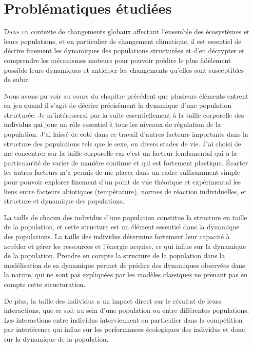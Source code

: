 \chapter{Problématiques étudiées}

\lettrine[lines=3]{D}{ans un} contexte de changements globaux affectant
l'ensemble des écosystèmes et leurs populations, et en particulier de changement
climatique, il est essentiel de décrire finement les dynamiques des populations
structurées et d’en décrypter et comprendre les mécanismes moteurs pour pouvoir
prédire le plus fidèlement possible leurs dynamiques et anticiper les
changements qu'elles sont susceptibles de subir.

Nous avons pu voir au cours du chapitre précédent que plusieurs éléments entrent
en jeu quand il s'agit de décrire précisément la dynamique d'une population
structurée. Je m’intéresserai par la suite essentiellement à la taille
corporelle des individus qui joue un rôle essentiel à tous les niveaux de
régulation de la population.
J’ai laissé de coté dans ce travail d’autres facteurs importants dans la
structure des populations tels que le sexe, ou divers stades de vie. J’ai choisi
de me concentrer sur la taille corporelle car c’est un facteur fondamental qui a
la particularité de varier de manière continue et qui est fortement plastique.
Écarter les autres facteurs m’a permis de me placer dans un cadre suffisamment
simple pour pouvoir explorer finement d’un point de vue théorique et
expérimental les liens entre facteurs abiotiques (température), normes de
réaction individuelles, et structure et dynamique des populations.

La taille de chacun des individus d'une population constitue la
structure en taille de la population, et cette structure est un élément
essentiel dans la dynamique des populations. La taille des individus détermine
fortement leur capacité à accéder et gérer les ressources et l'énergie acquise,
ce qui influe sur la dynamique de la population. Prendre en compte la structure
de la population dans la modélisation de sa dynamique permet de prédire des
dynamiques observées dans la nature, qui ne sont pas expliquées par les modèles
classiques ne prenant pas en compte cette structuration.

De plus, la taille des individus a un impact direct sur le résultat de leurs
interactions, que ce soit au sein d'une population ou entre différentes
populations. Les interactions entre individus interviennent en particulier dans
la compétition par interférence qui influe sur les performances écologiques des
individus et donc sur la dynamique de la population. 

